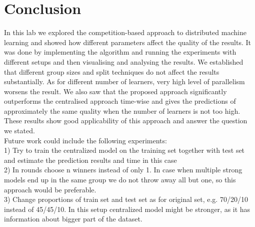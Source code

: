 \documentclass{scrartcl}
\begin{document}
\section{Conclusion}
In this lab we explored the competition-based approach to distributed machine learning and showed how different parameters affect the quality of the results. It was done by implementing the algorithm and running the experiments with different setups and then visualising and analysing the results. We established that different group sizes and split techniques do not affect the results substantially. As for different number of learners, very high level of parallelism worsens the result. We also saw that the proposed approach significantly outperforms the centralised approach time-wise and gives the predictions of approximately the same quality when the number of learners is not too high. These results show good applicability of this approach and answer the question we stated.\\
Future work could include the following experiments:\\
1)	Try to train the centralized model on the training set together with test set and estimate the prediction results and time in this case\\
2)	In rounds choose n winners instead of only 1. In case when multiple strong models end up in the same group we do not throw away all but one, so this approach would be preferable. \\
3)	Change proportions of train set and test set as for original set, e.g. 70/20/10 instead of 45/45/10. In this setup centralized model might be stronger, as it has information about bigger part of the dataset.\\



\end{document}
